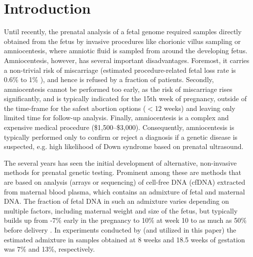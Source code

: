 \section{Introduction}

Until recently, the prenatal analysis of a fetal genome required samples directly obtained from the fetus by invasive procedures like chorionic villus sampling or amniocentesis, where amniotic fluid is sampled from around the developing fetus.
Amniocentesis, however, has several important disadvantages. Foremost, it carries a non-trivial risk of miscarriage (estimated procedure-related fetal loss rate is 0.6\% to 1\% \citep{douglas2007amnio}), and hence is refused by a fraction of patients. Secondly, amniocentesis cannot be performed too early, as the risk of miscarriage rises significantly, and is typically indicated for the 15th week of pregnancy, outside of the time-frame for the safest abortion options ($<$12 weeks) and leaving only limited time for follow-up analysis. Finally, amniocentesis is a complex and expensive medical procedure (\$1,500--\$3,000). Consequently, amniocentesis is typically performed only to confirm or reject a diagnosis if a genetic disease is suspected, e.g. high likelihood of Down syndrome based on prenatal ultrasound. 

The several years has seen the initial development of alternative, non-invasive methods for prenatal genetic testing. Prominent among these are methods that are based on analysis (arrays or sequencing) of  cell-free DNA (cfDNA) extracted from maternal blood plasma, which contains an admixture of fetal and maternal DNA. The fraction of fetal DNA in such an admixture varies depending on multiple factors, including maternal weight and size of the fetus, but typically builds up from -7\% early in the pregnancy to 10\% at week 10 \citep{wang2013} to as much as 50\% before delivery \citep{wang2013, fan2012}. In experiments conducted by \cite{kitzman2012} (and utilized in this paper) the estimated admixture in samples obtained at 8 weeks and 18.5 weeks of gestation was 7\% and 13\%, respectively. 

